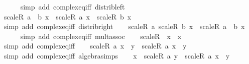 \begin{isabellebody}
\ \ \ \ \isamarkupfalse%
\ {\isacharparenleft}{\kern0pt}simp\ add{\isacharcolon}{\kern0pt}\ complex{\isacharunderscore}{\kern0pt}eq{\isacharunderscore}{\kern0pt}iff\ distrib{\isacharunderscore}{\kern0pt}left{\isacharparenright}{\kern0pt}\isanewline
\ \ \isamarkupfalse%
\ {\isachardoublequoteopen}scaleR\ {\isacharparenleft}{\kern0pt}a\ {\isacharplus}{\kern0pt}\ b{\isacharparenright}{\kern0pt}\ x\ {\isacharequal}{\kern0pt}\ scaleR\ a\ x\ {\isacharplus}{\kern0pt}\ scaleR\ b\ x{\isachardoublequoteclose}\isanewline
\ \ \ \ \isamarkupfalse%
\ {\isacharparenleft}{\kern0pt}simp\ add{\isacharcolon}{\kern0pt}\ complex{\isacharunderscore}{\kern0pt}eq{\isacharunderscore}{\kern0pt}iff\ distrib{\isacharunderscore}{\kern0pt}right{\isacharparenright}{\kern0pt}\isanewline
\ \ \isamarkupfalse%
\ {\isachardoublequoteopen}scaleR\ a\ {\isacharparenleft}{\kern0pt}scaleR\ b\ x{\isacharparenright}{\kern0pt}\ {\isacharequal}{\kern0pt}\ scaleR\ {\isacharparenleft}{\kern0pt}a\ {\isacharasterisk}{\kern0pt}\ b{\isacharparenright}{\kern0pt}\ x{\isachardoublequoteclose}\isanewline
\ \ \ \ \isamarkupfalse%
\ {\isacharparenleft}{\kern0pt}simp\ add{\isacharcolon}{\kern0pt}\ complex{\isacharunderscore}{\kern0pt}eq{\isacharunderscore}{\kern0pt}iff\ mult{\isachardot}{\kern0pt}assoc{\isacharparenright}{\kern0pt}\isanewline
\ \ \isamarkupfalse%
\ {\isachardoublequoteopen}scaleR\ {}\ x\ {\isacharequal}{\kern0pt}\ x{\isachardoublequoteclose}\isanewline
\ \ \ \ \isamarkupfalse%
\ {\isacharparenleft}{\kern0pt}simp\ add{\isacharcolon}{\kern0pt}\ complex{\isacharunderscore}{\kern0pt}eq{\isacharunderscore}{\kern0pt}iff{\isacharparenright}{\kern0pt}\isanewline
\ \ \isamarkupfalse%
\ {\isachardoublequoteopen}scaleR\ a\ x\ {\isacharasterisk}{\kern0pt}\ y\ {\isacharequal}{\kern0pt}\ scaleR\ a\ {\isacharparenleft}{\kern0pt}x\ {\isacharasterisk}{\kern0pt}\ y{\isacharparenright}{\kern0pt}{\isachardoublequoteclose}\isanewline
\ \ \ \ \isamarkupfalse%
\ {\isacharparenleft}{\kern0pt}simp\ add{\isacharcolon}{\kern0pt}\ complex{\isacharunderscore}{\kern0pt}eq{\isacharunderscore}{\kern0pt}iff\ algebra{\isacharunderscore}{\kern0pt}simps{\isacharparenright}{\kern0pt}\isanewline
\ \ \isamarkupfalse%
\ {\isachardoublequoteopen}x\ {\isacharasterisk}{\kern0pt}\ scaleR\ a\ y\ {\isacharequal}{\kern0pt}\ scaleR\ a\ {\isacharparenleft}{\kern0pt}x\ {\isacharasterisk}{\kern0pt}\ y{\isacharparenright}{\kern0pt}{\isachardoublequoteclose}\isanewline
\ \ \ \ \isamarkupfalse%

\end{isabellebody}
